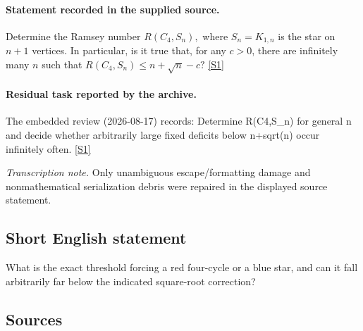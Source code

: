\documentclass[11pt,a4paper]{article}
\newcommand{\sref}[2]{\hyperlink{source:#1:#2}{[S#2]}}
\begin{document}
\paragraph{Statement recorded in the supplied source.}
Determine the Ramsey number $ R(C_4,S_n), $ where $S_n=K_{1,n}$ is the star on $n+1$ vertices.
In particular, is it true that, for any $c>0$, there are infinitely many $n$ such that $ R(C_4,S_n)\leq n+\sqrt{n}-c? $ \sref{2172}{1}

\paragraph{Residual task reported by the archive.}

The embedded review (2026-08-17) records: Determine R(C4,S\_n) for general n and decide whether arbitrarily large fixed deficits below n+sqrt(n) occur infinitely often. \sref{2172}{1}

{\small\emph{Transcription note.} Only unambiguous escape/formatting damage and nonmathematical serialization debris were repaired in the displayed source statement.}

\subsection{Short English statement}

What is the exact threshold forcing a red four-cycle or a blue star, and can it fall arbitrarily far below the indicated square-root correction?

\subsection{Sources}
\end{document}

